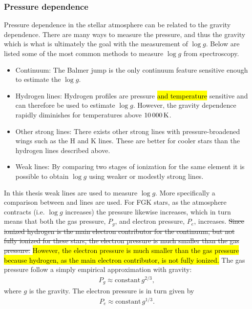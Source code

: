 \subsubsection{Pressure dependence}

Pressure dependence in the stellar atmosphere can be related to the gravity dependence. There are
many ways to measure the pressure, and thus the gravity which is what is ultimately the goal with
the measurement of $\log g$. Below are listed some of the most common methods to measure $\log g$
from spectroscopy.

\begin{itemize}
  \item Continuum: The Balmer jump is the only continuum feature sensitive enough to estimate the
        $\log g$.
  \item Hydrogen lines: Hydrogen profiles are pressure \hl{and temperature} sensitive and can
        therefore be used to estimate $\log g$. However, the gravity dependence rapidly diminishes
        for temperatures above $\SI{10\,000}{K}$.
  \item Other strong lines: There exists other strong lines with pressure-broadened wings such as
        the  H and K lines. These are better for cooler stars than the hydrogen lines
        described above.
  \item Weak lines: By comparing two stages of ionization for the same element it is possible to
        obtain $\log g$ using weaker or modestly strong lines.
\end{itemize}
In this thesis weak lines are used to measure $\log g$. More specifically a comparison between
 and  lines are used. For FGK stars, as the atmosphere contracts (i.e. $\log
g$ increases) the pressure likewise increases, which in turn means that both the gas pressure,
$P_g$, and electron pressure, $P_e$, increases. \st{Since ionized hydrogen is the main electron
contributor for the continuum, but not fully ionized for these stars, the electron pressure is much
smaller than the gas pressure.} \hl{However, the electron pressure is much smaller than the gas
pressure because hydrogen, as the main electron contributor, is not fully ionized.} The gas pressure
follow a simply empirical approximation with gravity:
\begin{align}
  P_g \approx \mathrm{constant}\, g^{2/3},
\end{align}
where $g$ is the gravity. The electron pressure is in turn given by
\begin{align}
  P_e \approx \mathrm{constant}\, g^{1/3}.
\end{align}

